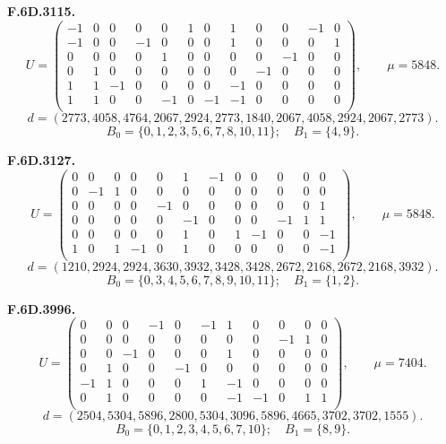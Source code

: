 \par\medskip\noindent\begin{minipage}{\linewidth}\textbf{F.6D.3115.}
\begingroup\small\setlength{\arraycolsep}{3pt}
\[U=\begin{pmatrix}
-1 & 0 & 0 & 0 & 0 & 1 & 0 & 1 & 0 & 0 & -1 & 0\\
-1 & 0 & 0 & -1 & 0 & 0 & 0 & 1 & 0 & 0 & 0 & 1\\
0 & 0 & 0 & 0 & 1 & 0 & 0 & 0 & 0 & -1 & 0 & 0\\
0 & 1 & 0 & 0 & 0 & 0 & 0 & 0 & -1 & 0 & 0 & 0\\
1 & 1 & -1 & 0 & 0 & 0 & 0 & -1 & 0 & 0 & 0 & 0\\
1 & 1 & 0 & 0 & -1 & 0 & -1 & -1 & 0 & 0 & 0 & 0\\
\end{pmatrix},\qquad \mu=5848.\]
\[d=(2773,4058,4764,2067,2924,2773,1840,2067,4058,2924,2067,2773).\]
\[B_0=\{0,1,2,3,5,6,7,8,10,11\};\quad B_1=\{4,9\}.\]
\endgroup\end{minipage}\par
\par\medskip\noindent\begin{minipage}{\linewidth}\textbf{F.6D.3127.}
\begingroup\small\setlength{\arraycolsep}{3pt}
\[U=\begin{pmatrix}
0 & 0 & 0 & 0 & 0 & 1 & -1 & 0 & 0 & 0 & 0 & 0\\
0 & -1 & 1 & 0 & 0 & 0 & 0 & 0 & 0 & 0 & 0 & 0\\
0 & 0 & 0 & 0 & -1 & 0 & 0 & 0 & 0 & 0 & 0 & 1\\
0 & 0 & 0 & 0 & 0 & -1 & 0 & 0 & 0 & -1 & 1 & 1\\
0 & 0 & 0 & 0 & 0 & 1 & 0 & 1 & -1 & 0 & 0 & -1\\
1 & 0 & 1 & -1 & 0 & 1 & 0 & 0 & 0 & 0 & 0 & -1\\
\end{pmatrix},\qquad \mu=5848.\]
\[d=(1210,2924,2924,3630,3932,3428,3428,2672,2168,2672,2168,3932).\]
\[B_0=\{0,3,4,5,6,7,8,9,10,11\};\quad B_1=\{1,2\}.\]
\endgroup\end{minipage}\par
\par\medskip\noindent\begin{minipage}{\linewidth}\textbf{F.6D.3996.}
\begingroup\small\setlength{\arraycolsep}{3pt}
\[U=\begin{pmatrix}
0 & 0 & 0 & -1 & 0 & -1 & 1 & 0 & 0 & 0 & 0\\
0 & 0 & 0 & 0 & 0 & 0 & 0 & 0 & -1 & 1 & 0\\
0 & 0 & -1 & 0 & 0 & 0 & 1 & 0 & 0 & 0 & 0\\
0 & 1 & 0 & 0 & -1 & 0 & 0 & 0 & 0 & 0 & 0\\
-1 & 1 & 0 & 0 & 0 & 1 & -1 & 0 & 0 & 0 & 0\\
0 & 1 & 0 & 0 & 0 & 0 & -1 & -1 & 0 & 1 & 1\\
\end{pmatrix},\qquad \mu=7404.\]
\[d=(2504,5304,5896,2800,5304,3096,5896,4665,3702,3702,1555).\]
\[B_0=\{0,1,2,3,4,5,6,7,10\};\quad B_1=\{8,9\}.\]
\endgroup\end{minipage}\par
